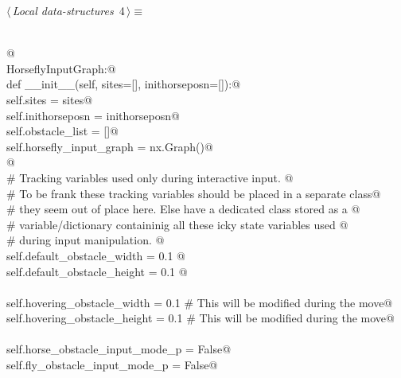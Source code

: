 \documentclass[11.5pt]{report}
\begin{document}
\begin{flushleft} \small\label{scrap2}\raggedright\small
{} $\langle\,${\itshape Local data-structures}\nobreak\ {\footnotesize {4}}$\,\rangle\equiv$
\vspace{-1ex}
\begin{list}{}{} \item
\mbox{}\verb@@\\
\mbox{}\verb@ @\\
\mbox{}\verb@class HorseflyInputGraph:@\\
\mbox{}\verb@      def __init__(self, sites=[], inithorseposn=[]):@\\
\mbox{}\verb@           self.sites                = sites@\\
\mbox{}\verb@           self.inithorseposn        = inithorseposn@\\
\mbox{}\verb@           self.obstacle_list        = []@\\
\mbox{}\verb@           self.horsefly_input_graph = nx.Graph()@\\
\mbox{}\verb@    @\\
\mbox{}\verb@           # Tracking variables used only during interactive input. @\\
\mbox{}\verb@           # To be frank these tracking variables should be placed in a separate class@\\
\mbox{}\verb@           # they seem out of place here. Else have a dedicated class stored as a @\\
\mbox{}\verb@           # variable/dictionary containinig all these icky state variables used @\\
\mbox{}\verb@           # during input manipulation. @\\
\mbox{}\verb@           self.default_obstacle_width   = 0.1 @\\
\mbox{}\verb@           self.default_obstacle_height  = 0.1 @\\
\mbox{}\verb@@\\
\mbox{}\verb@           self.hovering_obstacle_width  = 0.1 # This will be modified during the move@\\
\mbox{}\verb@           self.hovering_obstacle_height = 0.1 # This will be modified during the move@\\
\mbox{}\verb@@\\
\mbox{}\verb@           self.horse_obstacle_input_mode_p = False@\\
\mbox{}\verb@           self.fly_obstacle_input_mode_p = False@\\

\end{list}
\end{flushleft}
\end{document}
